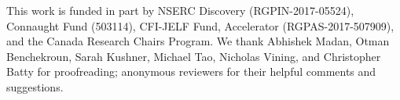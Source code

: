 \documentclass[acmtog, anonymous=false, review=false, balance=false]{acmart}
\begin{document}
\maketitle








\begin{acks}
This work is funded in part by NSERC Discovery (RGPIN-2017-05524), Connaught Fund (503114), CFI-JELF Fund, Accelerator (RGPAS-2017-507909), and the Canada Research Chairs Program.
We thank Abhishek Madan, Otman Benchekroun, Sarah Kushner, Michael Tao, Nicholas Vining, and Christopher Batty for proofreading; anonymous reviewers for their helpful comments and suggestions.
\end{acks}



\end{document}
